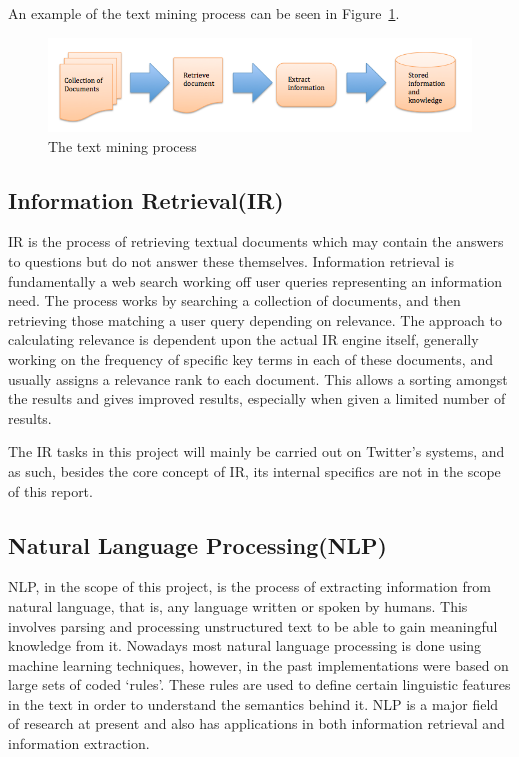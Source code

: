 An example of the text mining process can be seen in Figure~\ref{fig:tm}.
\begin{figure}[t]
\begin{center}
\includegraphics[width=15cm]{tm}
\end{center}
\caption{The text mining process\cite{Gupta_Lehal_2009}}
\label{fig:tm}
\end{figure}

\subsection[Information Retrieval]{Information Retrieval(IR)}
IR is the process of retrieving textual documents which may contain the answers to questions but do not answer these themselves\cite{hotho-etal-ldv-2005}. Information retrieval is fundamentally a web search working off user queries representing an information need. The process works by searching a collection of documents, and then retrieving those matching a user query depending on relevance. The approach to calculating relevance is dependent upon the actual IR engine itself, generally working on the frequency of specific key terms in each of these documents, and usually assigns a relevance rank to each document. This allows a sorting amongst the results and gives improved results, especially when given a limited number of results.

The IR tasks in this project will mainly be carried out on Twitter's systems, and as such, besides the core concept of IR, its internal specifics are not in the scope of this report.

\subsection[Natural Language Processing]{Natural Language Processing(NLP)}
NLP, in the scope of this project, is the process of extracting information from natural language\cite{Healey98}, that is, any language written or spoken by humans. This involves parsing and processing unstructured text to be able to gain meaningful knowledge from it. Nowadays most natural language processing is done using machine learning techniques, however, in the past implementations were based on large sets of coded `rules'. These rules are used to define certain linguistic features in the text in order to understand the semantics behind it. NLP is a major field of research at present and also has applications in both information retrieval and information extraction.

